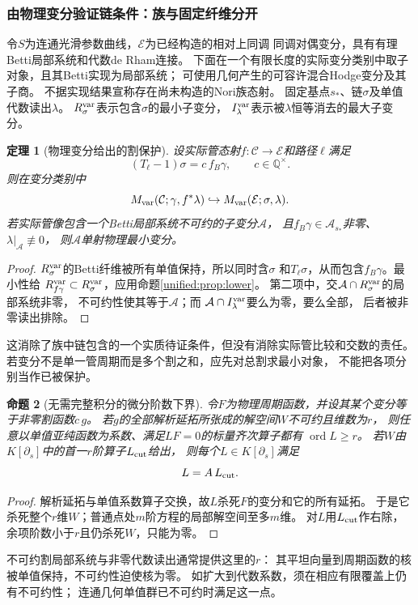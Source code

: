 \documentclass[11pt,a4paper,oneside]{ctexart}
\theoremstyle{cnplain}
\newtheorem{theorem}{定理}[section]
\newtheorem{proposition}[theorem]{命题}
\theoremstyle{definition}
\theoremstyle{remark}
\newcommand{\Q}{\mathbb Q}
\numberwithin{equation}{section}
\begin{document}
\subsubsection{由物理变分验证链条件：族与固定纤维分开}
令$S$为连通光滑参数曲线，$\mathcal E$为已经构造的相对上同调
同调对偶变分，具有有理Betti局部系统和代数de Rham连接。
下面在一个有限长度的实际变分类别中取子对象，且其Betti实现为局部系统；
可使用几何产生的可容许混合Hodge变分及其子商。
不据实现结果宣称存在尚未构造的Nori族态射。
固定基点$s_*$、链$\sigma$及单值代数读出$\lambda$。
$R_\sigma^{\rm var}$表示包含$\sigma$的最小子变分，
$I_\lambda^{\rm var}$表示被$\lambda$恒等消去的最大子变分。

\begin{theorem}[物理变分给出的割保护]\label{unified:thm:variation}
设实际管态射$f:\mathcal C\to\mathcal E$和路径$\ell$满足
\[
 (T_\ell-1)\sigma=c\,f_B\gamma,\qquad c\in\Q^\times.
\]
则在变分类别中
\[
 M_{\rm var}(\mathcal C;\gamma,f^*\lambda)
 \hookrightarrow M_{\rm var}(\mathcal E;\sigma,\lambda).
\]
若实际管像包含一个Betti局部系统不可约的子变分$\mathcal A$，
且$f_B\gamma\in\mathcal A_{s_*}$非零、$\lambda|_{\mathcal A}\not\equiv0$，
则$\mathcal A$单射物理最小变分。
\end{theorem}
\begin{proof}
$R_\sigma^{\rm var}$的Betti纤维被所有单值保持，所以同时含$\sigma$
和$T_\ell\sigma$，从而包含$f_B\gamma$。最小性给
$R_{f\gamma}^{\rm var}\subset R_\sigma^{\rm var}$，应用命题\ref{unified:prop:lower}。
第二项中，交$\mathcal A\cap R_\sigma^{\rm var}$的局部系统非零，
不可约性使其等于$\mathcal A$；而
$\mathcal A\cap I_\lambda^{\rm var}$要么为零，要么全部，
后者被非零读出排除。
\end{proof}
这消除了族中链包含的一个实质待证条件，但没有消除实际管比较和交数的责任。
若变分不是单一管周期而是多个割之和，应先对总割求最小对象，
不能把各项分别当作已被保护。

\begin{proposition}[无需完整积分的微分阶数下界]\label{unified:prop:order}
令$F$为物理周期函数，并设其某个变分等于非零割函数$c\,g$。
若$g$的全部解析延拓所张成的解空间$W$不可约且维数为$r$，
则任意以单值亚纯函数为系数、满足$LF=0$的标量齐次算子都有
$\operatorname{ord}L\ge r$。
若$W$由$K[\partial_s]$中的首一$r$阶算子$L_{\rm cut}$给出，
则每个$L\in K[\partial_s]$满足
\[
 L=A\,L_{\rm cut}.
\]
\end{proposition}
\begin{proof}
解析延拓与单值系数算子交换，故$L$杀死$F$的变分和它的所有延拓。
于是它杀死整个$r$维$W$；普通点处$m$阶方程的局部解空间至多$m$维。
对$L$用$L_{\rm cut}$作右除，余项阶数小于$r$且仍杀死$W$，只能为零。
\end{proof}
不可约割局部系统与非零代数读出通常提供这里的$r$：
其平坦向量到周期函数的核被单值保持，不可约性迫使核为零。
如扩大到代数系数，须在相应有限覆盖上仍有不可约性；
连通几何单值群已不可约时满足这一点。
\end{document}
